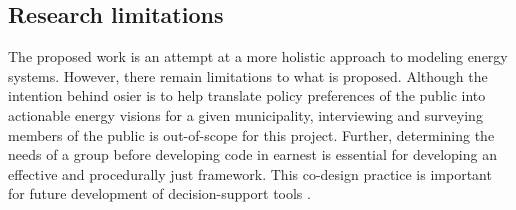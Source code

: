 \subsection{Research limitations}

The proposed work is an attempt at a more holistic approach to modeling energy
systems. However, there remain limitations to what is proposed. Although the
intention behind \ac{osier} is to help translate policy preferences of the
public into actionable energy visions for a given municipality, interviewing and
surveying members of the public is out-of-scope for this project. Further,
determining the needs of a group before developing code in earnest is essential
for developing an effective and procedurally just framework. This co-design
practice is important for future development of decision-support tools
\cite{gonzalez_developing_2022,ryder_developing_2018}.

